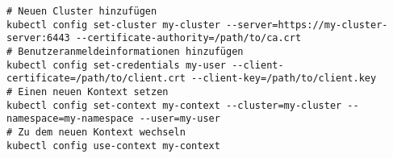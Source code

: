 \begin{verbatim}
# Neuen Cluster hinzufügen
kubectl config set-cluster my-cluster --server=https://my-cluster-server:6443 --certificate-authority=/path/to/ca.crt
# Benutzeranmeldeinformationen hinzufügen
kubectl config set-credentials my-user --client-certificate=/path/to/client.crt --client-key=/path/to/client.key
# Einen neuen Kontext setzen
kubectl config set-context my-context --cluster=my-cluster --namespace=my-namespace --user=my-user
# Zu dem neuen Kontext wechseln
kubectl config use-context my-context
\end{verbatim}